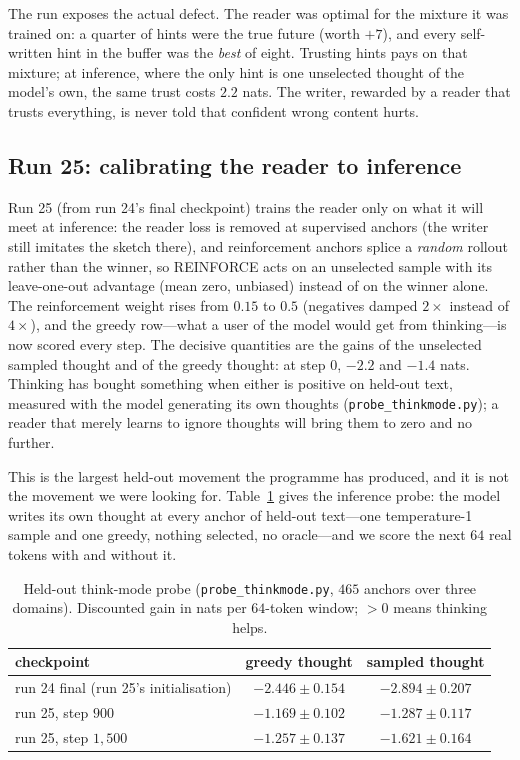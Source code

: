 \documentclass{article} %
\begin{document}
The run exposes the actual defect. The reader was optimal for the mixture it was trained on: a quarter of hints were the true future (worth $+7$), and every self-written hint in the buffer was the \emph{best} of eight. Trusting hints pays on that mixture; at inference, where the only hint is one unselected thought of the model's own, the same trust costs $2.2$ nats. The writer, rewarded by a reader that trusts everything, is never told that confident wrong content hurts.

\subsection{Run 25: calibrating the reader to inference}
\label{sec:run25}

Run 25 (from run 24's final checkpoint) trains the reader only on what it will meet at inference: the reader loss is removed at supervised anchors (the writer still imitates the sketch there), and reinforcement anchors splice a \emph{random} rollout rather than the winner, so REINFORCE acts on an unselected sample with its leave-one-out advantage (mean zero, unbiased) instead of on the winner alone. The reinforcement weight rises from $0.15$ to $0.5$ (negatives damped $2\times$ instead of $4\times$), and the greedy row---what a user of the model would get from thinking---is now scored every step. The decisive quantities are the gains of the unselected sampled thought and of the greedy thought: at step $0$, $-2.2$ and $-1.4$ nats. Thinking has bought something when either is positive on held-out text, measured with the model generating its own thoughts (\texttt{probe\_thinkmode.py}); a reader that merely learns to ignore thoughts will bring them to zero and no further.

This is the largest held-out movement the programme has produced, and it is not the movement we were looking for. Table~\ref{tab:run25probe} gives the inference probe: the model writes its own thought at every anchor of held-out text---one temperature-1 sample and one greedy, nothing selected, no oracle---and we score the next $64$ real tokens with and without it.

\begin{table}[h]
\centering
\caption{Held-out think-mode probe (\texttt{probe\_thinkmode.py}, $465$ anchors over three domains). Discounted gain in nats per $64$-token window; $>0$ means thinking helps.}
\label{tab:run25probe}
\begin{tabular}{lcc}
\toprule
checkpoint & greedy thought & sampled thought \\
\midrule
run 24 final (run 25's initialisation) & $-2.446 \pm 0.154$ & $-2.894 \pm 0.207$ \\
run 25, step $900$                     & $\mathbf{-1.169 \pm 0.102}$ & $-1.287 \pm 0.117$ \\
run 25, step $1{,}500$                 & $-1.257 \pm 0.137$ & $-1.621 \pm 0.164$ \\
\bottomrule
\end{tabular}
\end{table}
\end{document}
